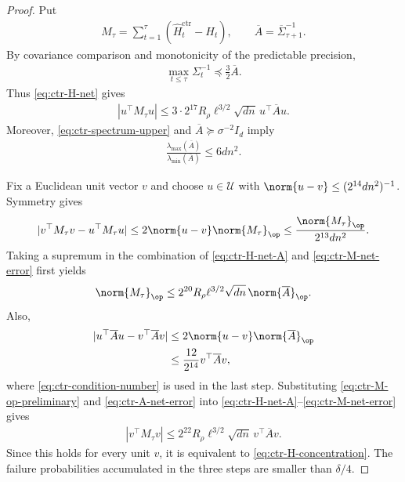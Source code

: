\begin{proof}
    Put
    \begin{align}
        M_\tau=\sum_{t=1}^{\tau}
        (\widehat H_t^{\mathrm{ctr}}-H_t),
        \qquad
        \overline A=\overline\Sigma_{\tau+1}^{-1}.
    \end{align}
    By covariance comparison and monotonicity of the predictable precision,
    \begin{align}
        \max_{t\leq\tau}\Sigma_t^{-1}
        \preceq\frac32\overline A.
    \end{align}
    Thus \eqref{eq:ctr-H-net} gives
    \begin{align}
        |u^\top M_\tau u|
        \leq3\cdot2^{17}R_\rho\ell^{3/2}\sqrt{dn}\,
        u^\top\overline A u.
        \label{eq:ctr-H-net-A}
    \end{align}
    Moreover, \eqref{eq:ctr-spectrum-upper} and
    $\overline A\succeq\sigma^{-2}I_d$ imply
    \begin{align}
        \frac{\lambda_{\max}(\overline A)}
        {\lambda_{\min}(\overline A)}
        \leq6dn^2.
        \label{eq:ctr-condition-number}
    \end{align}

    Fix a Euclidean unit vector $v$ and choose $u\in\mathcal U$ with
    $\norm{u-v}\leq(2^{14}dn^2)^{-1}$.  Symmetry gives
    \begin{align}
        |v^\top M_\tau v-u^\top M_\tau u|
        \leq2\norm{u-v}\norm{M_\tau}_{\op}
        \leq\frac{\norm{M_\tau}_{\op}}{2^{13}dn^2}.
        \label{eq:ctr-M-net-error}
    \end{align}
    Taking a supremum in the combination of
    \eqref{eq:ctr-H-net-A} and \eqref{eq:ctr-M-net-error} first yields
    \begin{align}
        \norm{M_\tau}_{\op}
        \leq2^{20}R_\rho\ell^{3/2}\sqrt{dn}\,
        \norm{\overline A}_{\op}.
        \label{eq:ctr-M-op-preliminary}
    \end{align}
    Also,
    \begin{align}
        |u^\top\overline A u-v^\top\overline A v|
         & \leq2\norm{u-v}\norm{\overline A}_{\op}
        \\
         & \leq\frac{12}{2^{14}}
        v^\top\overline A v,
        \label{eq:ctr-A-net-error}
    \end{align}
    where \eqref{eq:ctr-condition-number} is used in the last step.  Substituting
    \eqref{eq:ctr-M-op-preliminary} and \eqref{eq:ctr-A-net-error} into
    \eqref{eq:ctr-H-net-A}--\eqref{eq:ctr-M-net-error} gives
    \begin{align}
        |v^\top M_\tau v|
        \leq2^{22}R_\rho\ell^{3/2}\sqrt{dn}\,
        v^\top\overline A v.
    \end{align}
    Since this holds for every unit $v$, it is equivalent to
    \eqref{eq:ctr-H-concentration}.  The failure probabilities accumulated in
    the three steps are smaller than $\delta/4$.
\end{proof}

